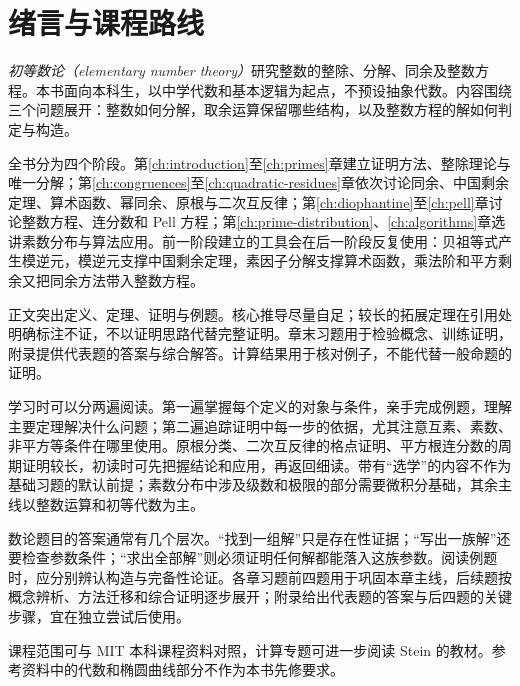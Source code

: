 \chapter{绪言与课程路线}
\label{ch:course-outline}

\emph{初等数论（elementary number theory）}研究整数的整除、分解、同余及整数方程。本书面向本科生，以中学代数和基本逻辑为起点，不预设抽象代数。内容围绕三个问题展开：整数如何分解，取余运算保留哪些结构，以及整数方程的解如何判定与构造。

全书分为四个阶段。第\ref{ch:introduction}至\ref{ch:primes}章建立证明方法、整除理论与唯一分解；第\ref{ch:congruences}至\ref{ch:quadratic-residues}章依次讨论同余、中国剩余定理、算术函数、幂同余、原根与二次互反律；第\ref{ch:diophantine}至\ref{ch:pell}章讨论整数方程、连分数和 Pell 方程；第\ref{ch:prime-distribution}、\ref{ch:algorithms}章选讲素数分布与算法应用。前一阶段建立的工具会在后一阶段反复使用：贝祖等式产生模逆元，模逆元支撑中国剩余定理，素因子分解支撑算术函数，乘法阶和平方剩余又把同余方法带入整数方程。

正文突出定义、定理、证明与例题。核心推导尽量自足；较长的拓展定理在引用处明确标注不证，不以证明思路代替完整证明。章末习题用于检验概念、训练证明，附录提供代表题的答案与综合解答。计算结果用于核对例子，不能代替一般命题的证明。

学习时可以分两遍阅读。第一遍掌握每个定义的对象与条件，亲手完成例题，理解主要定理解决什么问题；第二遍追踪证明中每一步的依据，尤其注意互素、素数、非平方等条件在哪里使用。原根分类、二次互反律的格点证明、平方根连分数的周期证明较长，初读时可先把握结论和应用，再返回细读。带有“选学”的内容不作为基础习题的默认前提；素数分布中涉及级数和极限的部分需要微积分基础，其余主线以整数运算和初等代数为主。

数论题目的答案通常有几个层次。“找到一组解”只是存在性证据；“写出一族解”还要检查参数条件；“求出全部解”则必须证明任何解都能落入这族参数。阅读例题时，应分别辨认构造与完备性论证。各章习题前四题用于巩固本章主线，后续题按概念辨析、方法迁移和综合证明逐步展开；附录给出代表题的答案与后四题的关键步骤，宜在独立尝试后使用。

课程范围可与 MIT 本科课程资料\cite{mit-syllabus,mit-notes}对照，计算专题可进一步阅读 Stein 的教材\cite{stein-book}。参考资料中的代数和椭圆曲线部分不作为本书先修要求。

